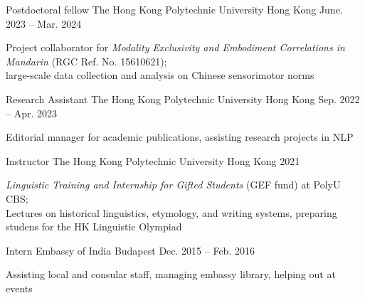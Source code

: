 
\begin{cventries}

  \cventry
    {Postdoctoral fellow} %
    {The Hong Kong Polytechnic University} %
    {Hong Kong} %
    {June. 2023 -- Mar. 2024} %
    {
      \begin{cvitems} %
        \item {Project collaborator for \textit{Modality Exclusivity and Embodiment Correlations in Mandarin} (RGC Ref. No. 15610621); \\ large-scale data collection and analysis on Chinese sensorimotor norms}
      \end{cvitems}
    }
   
  \cventry
    {Research Assistant} %
    {The Hong Kong Polytechnic University} %
    {Hong Kong} %
    {Sep. 2022 -- Apr. 2023} %
    {
      \begin{cvitems} %
        \item {Editorial manager for academic publications, assisting research projects in NLP}
      \end{cvitems}
    }  

  \cventry
    {Instructor} %
    {The Hong Kong Polytechnic University} %
    {Hong Kong} %
    {2021} %
    {
      \begin{cvitems} %
        \item {\textit{Linguistic Training and Internship for Gifted Students} (GEF fund) at PolyU CBS; \\ Lectures on historical linguistics, etymology, and writing systems, preparing studens for the HK Linguistic Olympiad}
      \end{cvitems}
    }

  \cventry
    {Intern} %
    {Embassy of India} %
    {Budapest} %
    {Dec. 2015 -- Feb. 2016} %
    {
      \begin{cvitems} %
        \item {Assisting local and consular staff, managing embassy library, helping out at events}
      \end{cvitems}
    }

\end{cventries}


